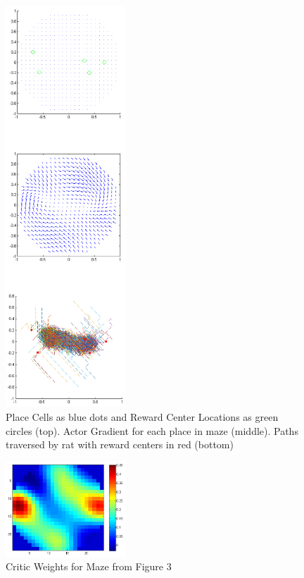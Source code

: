 \documentclass[conference]{IEEEtran}
\begin{document}
\begin{figure}
\includegraphics[width=0.4\textwidth]{waterMazeRevisedD_Figure.png} 
\caption{Place Cells as blue dots and Reward Center Locations as green circles (top). Actor Gradient for each place in maze (middle). Paths traversed by rat with reward centers in red (bottom)}
\end{figure}

\begin{figure}
\includegraphics[width=0.4\textwidth]{waterMazeRevisedD_Critic.png} 
\caption{Critic Weights for Maze from Figure 3}
\end{figure}
\end{document}
